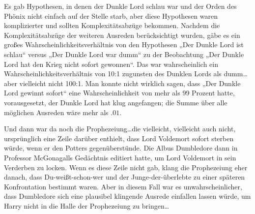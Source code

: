 Es gab Hypothesen, in denen der Dunkle Lord schlau war und der Orden des Phönix nicht einfach auf der Stelle starb, aber diese Hypothesen waren komplizierter und sollten Komplexitätsabzüge bekommen. Nachdem die Komplexitätsabzüge der weiteren Ausreden berücksichtigt wurden, gäbe es ein großes Wahrscheinlichkeitsverhältnis von den Hypothesen „Der Dunkle Lord ist schlau“ versus „Der Dunkle Lord war dumm“ zu der Beobachtung „Der Dunkle Lord hat den Krieg nicht sofort gewonnen“. Das war wahrscheinlich ein Wahrscheinlichkeitsverhältnis von 10:1 zugunsten des Dunklen Lords als dumm…aber vielleicht nicht 100:1. Man konnte nicht wirklich sagen, dass „Der Dunkle Lord gewinnt sofort“ eine Wahrscheinlichkeit von mehr als 99 Prozent hatte, vorausgesetzt, der Dunkle Lord hat klug angefangen; die Summe über alle möglichen Ausreden wäre mehr als $.01$.


Und dann war da noch die Prophezeiung…die vielleicht, vielleicht auch nicht, ursprünglich eine Zeile darüber enthielt, dass Lord Voldemort sofort sterben würde, wenn er den Potters gegenüberstünde. Die Albus Dumbledore dann in Professor McGonagalls Gedächtnis editiert hatte, um Lord Voldemort in sein Verderben zu locken. Wenn es diese Zeile nicht gab, klang die Prophezeiung eher danach, dass Du-weißt-schon-wer und der Junge-der-überlebte zu einer späteren Konfrontation bestimmt waren. Aber in diesem Fall war es unwahrscheinlicher, dass Dumbledore sich eine plausibel klingende Ausrede einfallen lassen würde, um Harry nicht in die Halle der Prophezeiung zu bringen…

